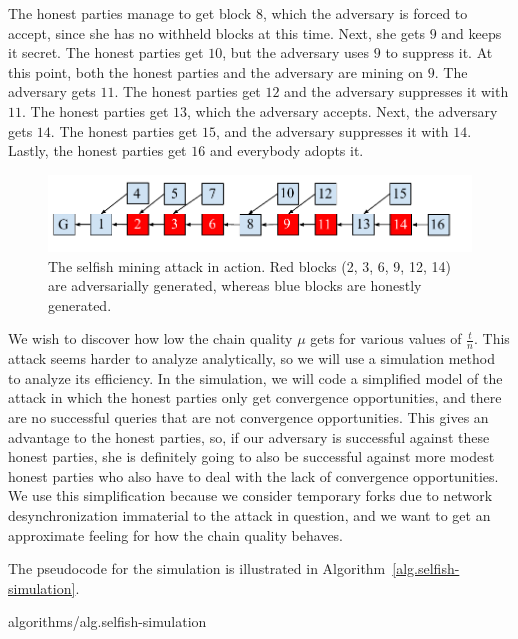 The honest parties manage to get block $8$, which the adversary is forced to accept, since she
has no withheld blocks at this time. Next, she gets $9$ and keeps it secret. The honest parties
get $10$, but the adversary uses $9$ to suppress it. At this point, both the honest parties
and the adversary are mining on $9$. The adversary gets $11$. The honest parties get $12$ and
the adversary suppresses it with $11$. The honest parties get $13$, which the adversary accepts.
Next, the adversary gets $14$. The honest parties get $15$, and the adversary suppresses it with
$14$. Lastly, the honest parties get $16$ and everybody adopts it.

\begin{figure}[h]
    \centering
    \includegraphics[width=\columnwidth,keepaspectratio]{figures/selfish-mining.pdf}
    \caption{The selfish mining attack in action. Red blocks (2, 3, 6, 9, 12, 14) are adversarially
             generated, whereas blue blocks are honestly generated.}
    \label{fig.selfish-mining}
\end{figure}

We wish to discover how low the chain quality $\mu$ gets for various values of
$\frac{t}{n}$. This attack seems harder to analyze analytically, so we will use a simulation
method to analyze its efficiency. In the simulation, we will code a simplified model of the attack
in which the honest parties only get convergence opportunities, and there are no successful queries
that are not convergence opportunities. This gives an advantage
to the honest parties, so, if our adversary is successful against these honest
parties, she is definitely going to also be successful against more modest honest parties
who also have to deal with the lack of convergence opportunities. We use this simplification
because we consider temporary forks due to network desynchronization immaterial to the attack in
question, and we want to get an approximate feeling for how the chain quality behaves.

The pseudocode for the simulation is illustrated in Algorithm~\ref{alg.selfish-simulation}.

{algorithms/alg.selfish-simulation}


